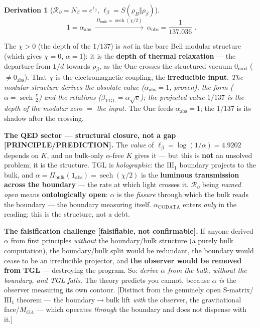 \documentclass[11pt]{article}
\newcommand{\bTGL}{\beta_{\mathrm{TGL}}}\newcommand{\Msun}{M_{\odot}}\newcommand{\TGL}{\mathrm{TGL}}
\theoremstyle{definition}\newtheorem{deriv}{Derivation}
\begin{document}
\begin{deriv}[$\mathcal{R}_\partial=N_\beta=e^{\ell_\beta}$, $\ell_\beta=S(\rho_B\Vert\rho_\beta)$]
\begin{equation}\boxed{\;1=\alpha_{\mathrm{abs}}\ \xrightarrow{\ \Pi_{\mathrm{bulk}}=\operatorname{sech}(\chi/2)\ }\ \alpha_{\mathrm{obs}}=\frac{1}{137.036}\;}.\end{equation}

The $\chi>0$ (the depth of the $1/137$) is \emph{not} in the bare Bell modular structure (which gives $\chi=0$, $\alpha=1$): it is the \textbf{depth of thermal relaxation} --- the departure from $\mathbf 1/d$ towards $\rho_\beta$, as the One crosses the structured vacuum $0_{\mathrm{mod}}$ ($\neq 0_{\mathrm{abs}}$). That $\chi$ is the electromagnetic coupling, the \textbf{irreducible input}. \emph{The modular structure derives the absolute value ($\alpha_{\mathrm{abs}}=1$, proven), the form ($\alpha=\operatorname{sech}\tfrac\chi2$) and the relations ($\bTGL=\alpha\sqrt e$); the projected value $1/137$ is the depth of the modular zero $=$ the input.} The One feeds $\alpha_{\mathrm{abs}}=1$; the $1/137$ is its shadow after the crossing.

\textbf{The QED sector --- structural closure, not a gap \textsf{[PRINCIPLE/PREDICTION]}.} The \emph{value} of $\ell_\beta=\log(1/\alpha)=4.9202$ depends on $K$, and no bulk-only $\alpha$-free $K$ gives it --- but this is \textbf{not} an unsolved problem; it is the structure. TGL is \emph{holographic}: the $\mathrm{III}_1$ boundary projects to the bulk, and $\alpha=\Pi_{\mathrm{bulk}}(\mathbf 1_{\mathrm{abs}})=\operatorname{sech}(\chi/2)$ is the \textbf{luminous transmission across the boundary} --- the rate at which light crosses it. $\mathcal{R}_\partial$ being \emph{named open} means \textbf{ontologically open}: $\alpha$ is the \emph{fissure} through which the bulk reads the boundary --- the boundary measuring itself. $\alpha_{\mathrm{CODATA}}$ enters \emph{only} in the reading; this is the structure, not a debt.

\textbf{The falsification challenge \textsf{[falsifiable, not confirmable]}.} If anyone derived $\alpha$ from first principles \emph{without} the boundary/bulk structure (a purely bulk computation), the boundary/bulk split would be redundant, the boundary would cease to be an irreducible projector, and \textbf{the observer would be removed from TGL} --- destroying the program. So: \emph{derive $\alpha$ from the bulk, without the boundary, and TGL falls.} The theory predicts you cannot, because $\alpha$ \emph{is} the observer measuring its own contour. \textsf{[Distinct from the genuinely open S-matrix/$\mathrm{III}_1$ theorem --- the boundary$\to$bulk lift \emph{with} the observer, the gravitational face/$M_{GA}$ --- which operates \emph{through} the boundary and does not dispense with it.]}


\end{deriv}
\end{document}
